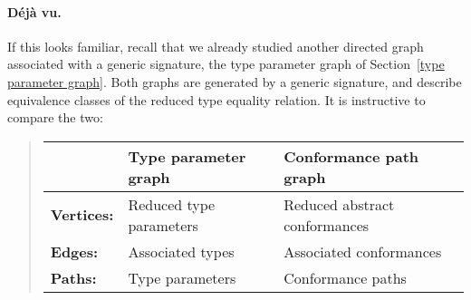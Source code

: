 \documentclass[../generics]{subfiles}
\begin{document}
\paragraph{D\'ej\`a vu.}
If this looks familiar, recall that we already studied another directed graph associated with a generic signature, the type parameter graph of Section~\ref{type parameter graph}. Both graphs are generated by a generic signature, and describe equivalence classes of the reduced type equality relation. It is instructive to compare the two:
\begin{quote}
\begin{tabular}{lll}
\toprule
&\textbf{Type parameter graph}&\textbf{Conformance path graph}\\
\midrule
\textbf{Vertices:}&Reduced type parameters&Reduced abstract conformances\\
\textbf{Edges:}&Associated types&Associated conformances\\
\textbf{Paths:}&Type parameters&Conformance paths\\
\bottomrule
\end{tabular}
\end{quote}
\end{document}
